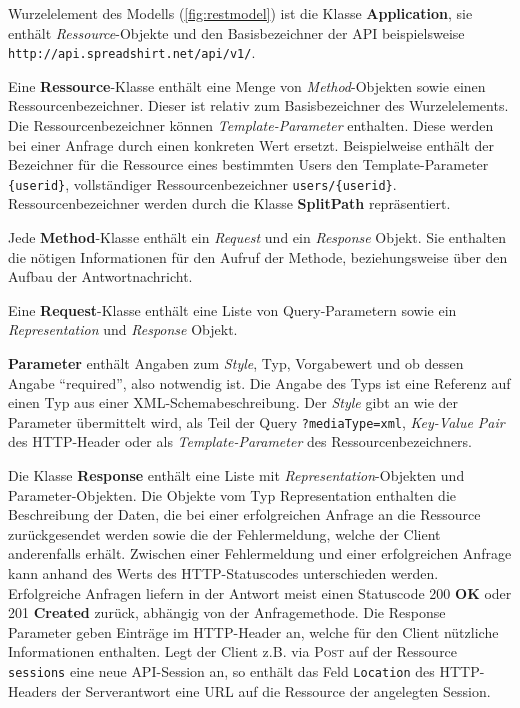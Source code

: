 Wurzelelement des Modells (\cref{fig:restmodel}) ist die Klasse \textbf{Application}, sie enthält \emph{Ressource}-Objekte und den Basisbezeichner der \gls{API} beispielsweise \texttt{\small http://api.spreadshirt.net/api/v1/}. 

Eine \textbf{Ressource}-Klasse enthält eine Menge von \emph{Method}-Objekten sowie einen Ressourcenbezeichner. Dieser ist relativ zum Basisbezeichner des Wurzelelements. Die Ressourcenbezeichner können \emph{Template-Parameter} enthalten. Diese werden bei einer Anfrage durch einen konkreten Wert ersetzt. Beispielweise enthält der Bezeichner für die Ressource eines bestimmten Users den Template-Parameter \texttt{\{userid\}}, vollständiger Ressourcenbezeichner \texttt{users/\{userid\}}. Ressourcenbezeichner werden durch die Klasse \textbf{SplitPath} repräsentiert. 

Jede \textbf{Method}-Klasse enthält ein \emph{Request} und ein \emph{Response} Objekt. Sie enthalten die nötigen Informationen für den Aufruf der Methode, beziehungsweise über den Aufbau der Antwortnachricht.

Eine \textbf{Request}-Klasse enthält eine Liste von Query-Parametern sowie ein \emph{Representation} und \emph{Response} Objekt.

\textbf{Parameter} enthält Angaben zum \emph{Style}, Typ, Vorgabewert und ob dessen Angabe \enquote{required}, also notwendig ist. Die Angabe des Typs ist eine Referenz auf einen Typ aus einer \gls{XML}-Schemabeschreibung. Der \emph{Style} gibt an wie der Parameter übermittelt wird, als Teil der Query \texttt{?mediaType=xml}, \emph{Key-Value Pair} des \gls{HTTP}-Header oder als \emph{Template-Parameter} des Ressourcenbezeichners. 

Die Klasse \textbf{Response} enthält eine Liste mit \emph{Representation}-Objekten und Parameter-Objekten. Die Objekte vom Typ Representation enthalten die Beschreibung der Daten, die bei einer erfolgreichen Anfrage an die Ressource zurückgesendet werden sowie die der Fehlermeldung, welche der Client anderenfalls erhält. Zwischen einer Fehlermeldung und einer erfolgreichen Anfrage kann anhand des Werts des \gls{HTTP}-Statuscodes unterschieden werden. Erfolgreiche Anfragen liefern in der Antwort meist einen Statuscode 200 \textbf{OK} oder 201 \textbf{Created} zurück, abhängig von der Anfragemethode. Die Response Parameter geben Einträge im \gls{HTTP}-Header an, welche für den Client nützliche Informationen enthalten. Legt der Client z.B. via \textsc{Post} auf der Ressource \texttt{sessions} eine neue \gls{API}-Session an, so enthält das Feld \texttt{Location} des \gls{HTTP}-Headers der Serverantwort eine \gls{URL} auf die Ressource der angelegten Session.

